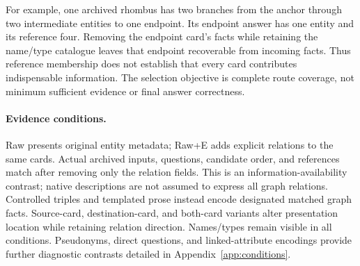 For example, one archived rhombus has two branches from the anchor through two intermediate entities to one endpoint. Its endpoint answer has one entity and its reference four. Removing the endpoint card's facts while retaining the name/type catalogue leaves that endpoint recoverable from incoming facts. Thus reference membership does not establish that every card contributes indispensable information. The selection objective is complete route coverage, not minimum sufficient evidence or final answer correctness.

\paragraph{Evidence conditions.}
Raw presents original entity metadata; Raw+E adds explicit relations to the same cards. Actual archived inputs, questions, candidate order, and references match after removing only the relation fields. This is an information-availability contrast; native descriptions are not assumed to express all graph relations. Controlled triples and templated prose instead encode designated matched graph facts. Source-card, destination-card, and both-card variants alter presentation location while retaining relation direction. Names/types remain visible in all conditions. Pseudonyms, direct questions, and linked-attribute encodings provide further diagnostic contrasts detailed in Appendix~\ref{app:conditions}.
